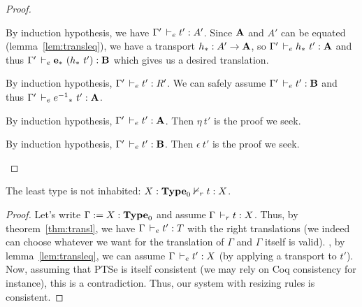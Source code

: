 \documentclass[a4paper,english]{lipics-utf8x}
\begin{document}
\begin{proof}
\begin{caselist}
      \nextcase
      \begin{mathc}
      \end{mathc}
      By induction hypothesis, we have $\Gamma' \,\vdash_e t' : A'$.
      Since $\operatorname{\mathbf{A}}$ and $A'$ can be equated (lemma~\ref{lem:transleq}),
      we have a transport $h_* : A' \to \operatorname{\mathbf{A}}$, so
      $\Gamma' \,\vdash_e h_*\ t' : \operatorname{\mathbf{A}}$ and thus
      $\Gamma' \,\vdash_e \operatorname{\mathbf{e}}_*\ (h_*\ t') : \operatorname{\mathbf{B}}$ which gives us a desired
      translation.

      \nextcase
      \begin{mathc}
      \end{mathc}
      By induction hypothesis, $\Gamma' \,\vdash_e t' : R'$.
      We can safely assume $\Gamma' \,\vdash_e t' : \operatorname{\mathbf{B}}$ and thus
      $\Gamma' \,\vdash_e {e^{-1}}_*\ t' : \operatorname{\mathbf{A}}$.

      \nextcase
      \begin{mathc}
      \end{mathc}
      By induction hypothesis, $\Gamma' \,\vdash_e t' : \operatorname{\mathbf{A}}$.
      Then $\eta\ t'$ is the proof we seek.

      \nextcase
      \begin{mathc}
      \end{mathc}
      By induction hypothesis, $\Gamma' \,\vdash_e t' : \operatorname{\mathbf{B}}$.
      Then $\epsilon\ t'$ is the proof we seek.
    \end{caselist}
  \end{proof}

  \begin{corollary}[Consistency]
    The least type is not inhabited: $X : \operatorname{\mathbf{Type}}_0 \nvdash_r t : X$.
  \end{corollary}

  \begin{proof}
    Let's write $\Gamma := X : \operatorname{\mathbf{Type}}_0$ and assume $\Gamma \,\vdash_r t : X$.
    Thus, by theorem~\ref{thm:transl}, we have $\Gamma \,\vdash_e t' : T$ with
    the right translations (we indeed can choose whatever we want for the
    translation of $\Gamma$ and $\Gamma$ itself is valid).
    \Wlog, by lemma~\ref{lem:transleq}, we can assume
    $\Gamma \,\vdash_e t' : X$ (by applying a transport to $t'$).
    Now, assuming that PTSe is itself consistent (we may rely on Coq consistency
    for instance), this is a contradiction.
    Thus, our system with resizing rules is consistent.
  \end{proof}
\end{document}
